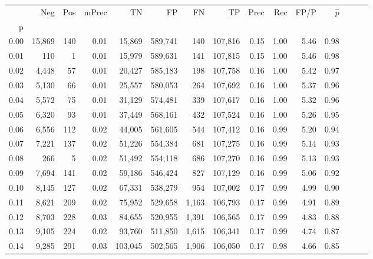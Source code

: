 \begin{tabular}{rrrrrrrrrrrrrrr}
\toprule
{} &     Neg &    Pos & mPrec &       TN &       FP &       FN &       TP &  Prec &   Rec &  FP/P & $\hat{p}$ \\
p    &         &        &       &          &          &          &          &       &       &       &           \\
\midrule
0.00 &  15,869 &    140 &  0.01 &   15,869 &  589,741 &      140 &  107,816 &  0.15 &  1.00 &  5.46 &      0.98 \\
0.01 &     110 &      1 &  0.01 &   15,979 &  589,631 &      141 &  107,815 &  0.15 &  1.00 &  5.46 &      0.98 \\
0.02 &   4,448 &     57 &  0.01 &   20,427 &  585,183 &      198 &  107,758 &  0.16 &  1.00 &  5.42 &      0.97 \\
0.03 &   5,130 &     66 &  0.01 &   25,557 &  580,053 &      264 &  107,692 &  0.16 &  1.00 &  5.37 &      0.96 \\
0.04 &   5,572 &     75 &  0.01 &   31,129 &  574,481 &      339 &  107,617 &  0.16 &  1.00 &  5.32 &      0.96 \\
0.05 &   6,320 &     93 &  0.01 &   37,449 &  568,161 &      432 &  107,524 &  0.16 &  1.00 &  5.26 &      0.95 \\
0.06 &   6,556 &    112 &  0.02 &   44,005 &  561,605 &      544 &  107,412 &  0.16 &  0.99 &  5.20 &      0.94 \\
0.07 &   7,221 &    137 &  0.02 &   51,226 &  554,384 &      681 &  107,275 &  0.16 &  0.99 &  5.14 &      0.93 \\
0.08 &     266 &      5 &  0.02 &   51,492 &  554,118 &      686 &  107,270 &  0.16 &  0.99 &  5.13 &      0.93 \\
0.09 &   7,694 &    141 &  0.02 &   59,186 &  546,424 &      827 &  107,129 &  0.16 &  0.99 &  5.06 &      0.92 \\
0.10 &   8,145 &    127 &  0.02 &   67,331 &  538,279 &      954 &  107,002 &  0.17 &  0.99 &  4.99 &      0.90 \\
0.11 &   8,621 &    209 &  0.02 &   75,952 &  529,658 &    1,163 &  106,793 &  0.17 &  0.99 &  4.91 &      0.89 \\
0.12 &   8,703 &    228 &  0.03 &   84,655 &  520,955 &    1,391 &  106,565 &  0.17 &  0.99 &  4.83 &      0.88 \\
0.13 &   9,105 &    224 &  0.02 &   93,760 &  511,850 &    1,615 &  106,341 &  0.17 &  0.99 &  4.74 &      0.87 \\
0.14 &   9,285 &    291 &  0.03 &  103,045 &  502,565 &    1,906 &  106,050 &  0.17 &  0.98 &  4.66 &      0.85 \\

\end{tabular}
